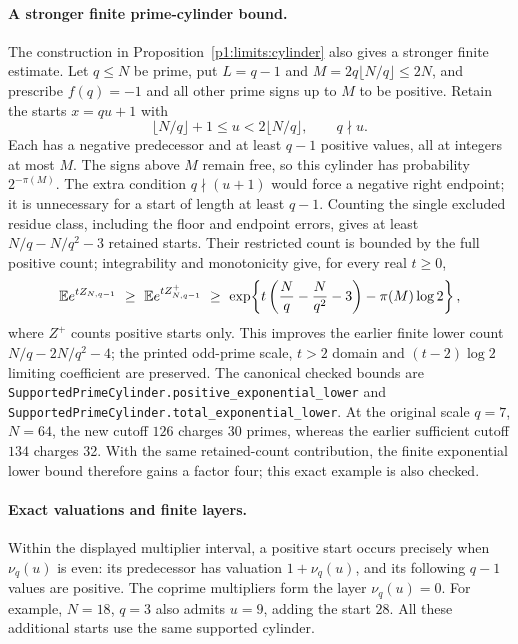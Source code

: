 \paragraph{A stronger finite prime-cylinder bound.}
The construction in Proposition~\ref{p1:limits:cylinder} also gives a
stronger finite estimate.  Let $q\leq N$ be prime, put $L=q-1$ and
$M=2q\lfloor N/q\rfloor\leq2N$, and prescribe $f(q)=-1$ and all other prime signs up to
$M$ to be positive.  Retain the starts $x=qu+1$ with
\[
 \lfloor N/q\rfloor+1\leq u<2\lfloor N/q\rfloor,
 \qquad q\nmid u.
\]
Each has a negative predecessor and at least $q-1$ positive values,
all at integers at most $M$.  The signs above $M$ remain free, so this
cylinder has probability $2^{-\pi(M)}$.
The extra condition $q\nmid(u+1)$ would force a negative right endpoint;
it is unnecessary for a start of length at least $q-1$.
Counting the single excluded residue class, including the floor and
endpoint errors, gives at least $N/q-N/q^2-3$ retained starts.
Their restricted count is bounded by the full positive count;
integrability and monotonicity give, for every real $t\geq0$,
\[
 \mathbb E e^{tZ_{N,q-1}}\ \geq\ \mathbb E e^{tZ^+_{N,q-1}}
 \ \geq\
 \exp\!\left\{t\left(\frac Nq-\frac N{q^2}-3\right)
                    -\pi(M)\log2\right\},
\]
where $Z^+$ counts positive starts only.  This improves the earlier
finite lower count $N/q-2N/q^2-4$; the printed odd-prime scale,
$t>2$ domain and $(t-2)\log2$ limiting coefficient are preserved.
The canonical checked bounds are
\texttt{SupportedPrimeCylinder.positive\_exponential\_lower} and
\texttt{SupportedPrimeCylinder.total\_exponential\_lower}.
At the original scale $q=7$, $N=64$, the new cutoff $126$ charges
30 primes, whereas the earlier sufficient cutoff $134$ charges 32.
With the same retained-count contribution, the finite exponential lower
bound therefore gains a factor four; this exact example is also checked.

\paragraph{Exact valuations and finite layers.}
Within the displayed multiplier interval, a positive start occurs
precisely when $\nu_q(u)$ is even: its predecessor has valuation
$1+\nu_q(u)$, and its following $q-1$ values are positive.
The coprime multipliers form the layer $\nu_q(u)=0$.
For example, $N=18$, $q=3$ also admits $u=9$, adding the start $28$.
All these additional starts use the same supported cylinder.

